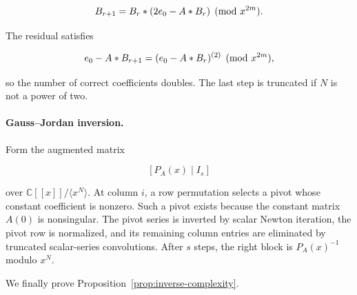 \documentclass[3p,12pt,authoryear]{elsarticle}
\theoremstyle{definition}
\theoremstyle{remark}
\newcommand{\C}{\mathbb C}
\newcommand{\ez}{e_{\mathstrut 0}}
\begin{document}
\begin{equation*}
B_{r+1}=B_r*(2\ez-A*B_r)\pmod{x^{2m}}.
\end{equation*}

The residual satisfies

\begin{equation*}
\ez-A*B_{r+1}=(\ez-A*B_r)^{(2)}\pmod{x^{2m}},
\end{equation*}

so the number of correct coefficients doubles. The last step is truncated if $N$ is not a power of two.

\paragraph{Gauss--Jordan inversion.}
Form the augmented matrix

\begin{equation*}
\left[P_A(x)\mid I_s\right]
\end{equation*}

over $\C[[x]]/\langle x^N\rangle$. At column $i$, a row permutation selects a pivot whose constant coefficient is nonzero. Such a pivot exists because the constant matrix $A(0)$ is nonsingular. The pivot series is inverted by scalar Newton iteration, the pivot row is normalized, and its remaining column entries are eliminated by truncated scalar-series convolutions. After $s$ steps, the right block is $P_A(x)^{-1}$ modulo $x^N$.

We finally prove Proposition~\ref{prop:inverse-complexity}.
\end{document}
